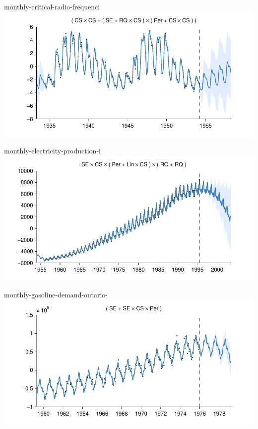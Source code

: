     
\begin{frame}{monthly-critical-radio-frequenci}
  \center
  \includegraphics[width=1.0\textwidth]{figures/monthly-critical-radio-frequenci/monthly-critical-radio-frequenci_all}
\end{frame}  


    
\begin{frame}{monthly-electricity-production-i}
  \center
  \includegraphics[width=1.0\textwidth]{figures/monthly-electricity-production-i/monthly-electricity-production-i_all}
\end{frame}  


    
\begin{frame}{monthly-gasoline-demand-ontario-}
  \center
  \includegraphics[width=1.0\textwidth]{figures/monthly-gasoline-demand-ontario-/monthly-gasoline-demand-ontario-_all}
\end{frame}  


